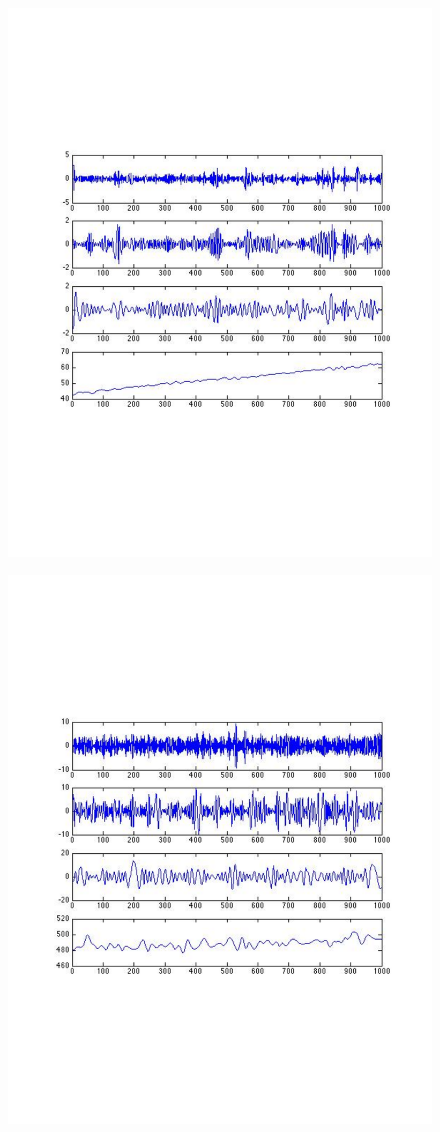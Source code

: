 \begin{figure}[t!] %
\centering
\includegraphics[width=0.75\columnwidth]{figs/KETI413_6h_light_3IMF}
\caption{}
\label{fig:light_3IMF}
\end{figure}

\begin{figure}[t!] %
\centering
\includegraphics[width=0.75\columnwidth]{figs/KETI413_co2_6h_3IMFs}
\caption{}
\label{fig:co2_3IMFs}
\end{figure}


